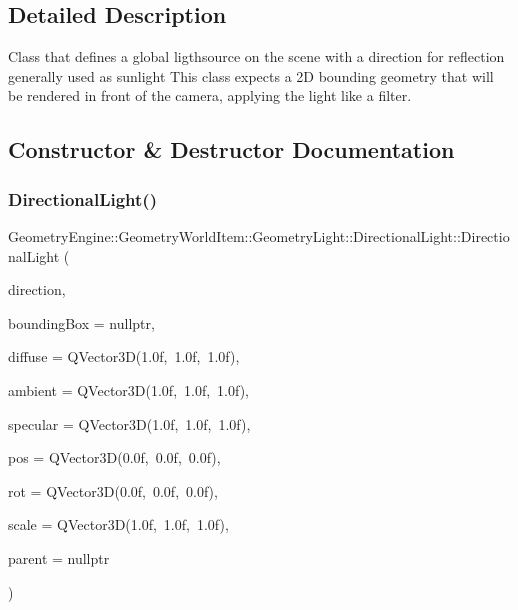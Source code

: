 \subsection{Detailed Description}
Class that defines a global ligthsource on the scene with a direction for reflection generally used as sunlight This class expects a 2D bounding geometry that will be rendered in front of the camera, applying the light like a filter. 

\subsection{Constructor \& Destructor Documentation}
\mbox{\label{class_geometry_engine_1_1_geometry_world_item_1_1_geometry_light_1_1_directional_light_ab11752fa06e7f257334bf12cab849139}} 
\subsubsection{\texorpdfstring{DirectionalLight()}{DirectionalLight()}}
{\footnotesize\ttfamily Geometry\+Engine\+::\+Geometry\+World\+Item\+::\+Geometry\+Light\+::\+Directional\+Light\+::\+Directional\+Light (\begin{DoxyParamCaption}\item[{const Q\+Vector3D \&}]{direction,  }\item[{\mbox{\hyperlink{class_geometry_engine_1_1_geometry_world_item_1_1_geometry_item_1_1_geometry_item}{Geometry\+Item\+::\+Geometry\+Item}} $\ast$}]{bounding\+Box = {\ttfamily nullptr},  }\item[{const Q\+Vector3D \&}]{diffuse = {\ttfamily QVector3D(1.0f,~1.0f,~1.0f)},  }\item[{const Q\+Vector3D \&}]{ambient = {\ttfamily QVector3D(1.0f,~1.0f,~1.0f)},  }\item[{const Q\+Vector3D \&}]{specular = {\ttfamily QVector3D(1.0f,~1.0f,~1.0f)},  }\item[{const Q\+Vector3D \&}]{pos = {\ttfamily QVector3D(0.0f,~0.0f,~0.0f)},  }\item[{const Q\+Vector3D \&}]{rot = {\ttfamily QVector3D(0.0f,~0.0f,~0.0f)},  }\item[{const Q\+Vector3D \&}]{scale = {\ttfamily QVector3D(1.0f,~1.0f,~1.0f)},  }\item[{\mbox{\hyperlink{class_geometry_engine_1_1_geometry_world_item_1_1_world_item}{World\+Item}} $\ast$}]{parent = {\ttfamily nullptr} }\end{DoxyParamCaption})}

